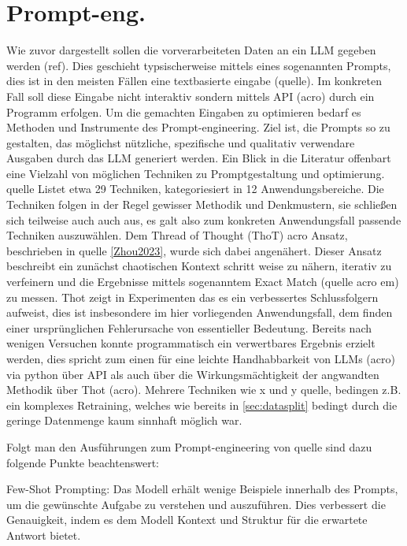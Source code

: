 \section{Prompt-eng.}
\label{sec:prompte}
Wie zuvor dargestellt sollen die vorverarbeiteten Daten an ein LLM gegeben werden (ref). Dies geschieht typsischerweise mittels eines sogenannten Prompts, dies ist in den meisten Fällen eine textbasierte eingabe (quelle). Im konkreten Fall soll diese Eingabe nicht interaktiv sondern mittels API (acro) durch ein Programm erfolgen. Um die gemachten Eingaben zu optimieren bedarf es Methoden und Instrumente des Prompt-engineering. Ziel ist, die Prompts so zu gestalten, das möglichst nützliche, spezifische und qualitativ verwendare Ausgaben durch das LLM generiert werden. Ein Blick in die Literatur offenbart eine Vielzahl von möglichen Techniken zu Promptgestaltung und optimierung. quelle Listet etwa 29 Techniken, kategoriesiert in 12 Anwendungsbereiche\autocite[S. 3]{Sahoo2024 S.3}. Die Techniken folgen in der Regel gewisser Methodik und Denkmustern, sie schließen sich teilweise auch auch aus, es galt also zum konkreten Anwendungsfall passende Techniken auszuwählen. Dem Thread of Thought (ThoT) acro Ansatz, beschrieben in quelle \autoref{Zhou2023}, wurde sich dabei angenähert. Dieser Ansatz beschreibt ein zunächst chaotischen Kontext schritt weise zu nähern, iterativ zu verfeinern und die Ergebnisse mittels sogenanntem Exact Match (quelle acro em) zu messen. Thot zeigt in Experimenten das es ein verbessertes Schlussfolgern aufweist, dies ist insbesondere im hier vorliegenden Anwendungsfall, dem finden einer ursprünglichen Fehlerursache von essentieller Bedeutung. Bereits nach wenigen Versuchen konnte programmatisch ein verwertbares Ergebnis erzielt werden, dies spricht zum einen für eine leichte Handhabbarkeit von LLMs (acro) via python über API als auch über die Wirkungsmächtigkeit der angwandten Methodik über Thot (acro). Mehrere Techniken wie x und y quelle, bedingen z.B. ein komplexes Retraining, welches wie bereits in \autoref{sec:datasplit} bedingt durch die geringe Datenmenge kaum sinnhaft möglich war.



Folgt man den Ausführungen zum Prompt-engineering von quelle sind dazu folgende Punkte beachtenswert:

Few-Shot Prompting: Das Modell erhält wenige Beispiele innerhalb des Prompts, um die gewünschte Aufgabe zu verstehen und auszuführen. Dies verbessert die Genauigkeit, indem es dem Modell Kontext und Struktur für die erwartete Antwort bietet. 
